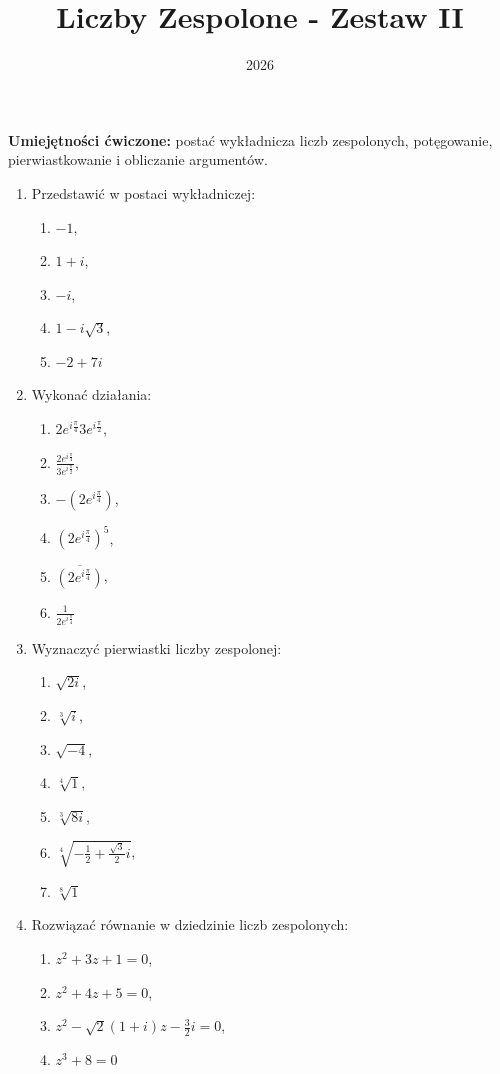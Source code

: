 \documentclass{article}
\title{Liczby Zespolone - Zestaw II}
\date{2026}
\begin{document}
\maketitle

\begin{center}
\textbf{Umiejętności ćwiczone:} postać wykładnicza liczb zespolonych, potęgowanie, pierwiastkowanie i obliczanie argumentów.
\end{center}



\begin{enumerate}
    \item Przedstawić w postaci wykładniczej:
    \begin{enumerate}
        \item $-1$,
        \item $1+i$,
        \item $-i$,
        \item $1-i\sqrt{3}$,
        \item $-2+7i$
    \end{enumerate}

    \item Wykonać działania:
    \begin{enumerate}
        \item $2e^{i\frac{\pi}{4}} 3e^{i\frac{\pi}{2}}$,
        \item $\frac{2e^{i\frac{\pi}{4}}}{3e^{i\frac{\pi}{2}}}$,
        \item $-(2e^{i\frac{\pi}{4}})$,
        \item $(2e^{i\frac{\pi}{4}})^{5}$,
        \item $\overline{(2e^{i\frac{\pi}{4}})}$,
        \item $\frac{1}{2e^{i\frac{\pi}{4}}}$
    \end{enumerate}

    \item Wyznaczyć pierwiastki liczby zespolonej:
    \begin{enumerate}
        \item $\sqrt{2i}$,
        \item $\sqrt[3]{i}$,
        \item $\sqrt{-4}$,
        \item $\sqrt[4]{1}$,
        \item $\sqrt[3]{8i}$,
        \item $\sqrt[4]{-\frac{1}{2} + \frac{\sqrt{3}}{2}i}$,
        \item $\sqrt[8]{1}$
    \end{enumerate}
    
    \item Rozwiązać równanie w dziedzinie liczb zespolonych:
    \begin{enumerate}
        \item $z^{2} + 3z + 1 = 0$,
        \item $z^{2} + 4z + 5 = 0$,
        \item $z^{2} - \sqrt{2}(1+i)z -\frac{3}{2}i = 0$,
        \item $z^{3} + 8 = 0$
    \end{enumerate}

\end{enumerate}
\end{document}
